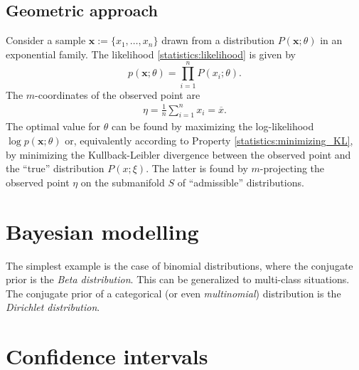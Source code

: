 {\subsection{Geometric approach}

    Consider a sample $\mathbf{x}:=\{x_1,\ldots,x_n\}$ drawn from a distribution $P(\mathbf{x};\theta)$ in an exponential family. The likelihood \eqref{statistics:likelihood} is given by \[p(\mathbf{x};\theta) = \prod_{i=1}^nP(x_i;\theta).\] The $m$-coordinates of the observed point are
    \begin{gather}
        \eta = \frac{1}{n}\sum_{i=1}^nx_i = \overline{x}.
    \end{gather}
    The optimal value for $\theta$ can be found by maximizing the log-likelihood $\log p(\mathbf{x};\theta)$ or, equivalently according to Property \ref{statistics:minimizing_KL}, by minimizing the Kullback-Leibler divergence between the observed point and the ``true'' distribution $P(x;\xi)$. The latter is found by $m$-projecting the observed point $\eta$ on the submanifold $S$ of ``admissible'' distributions.

\section{Bayesian modelling}

    \begin{example}
        The simplest example is the case of binomial distributions, where the conjugate prior is the \textit{Beta distribution}. This can be generalized to multi-class situations. The conjugate prior of a categorical (or even \textit{multinomial}) distribution is the \textit{Dirichlet distribution}.
    \end{example}

\section{Confidence intervals}

}
